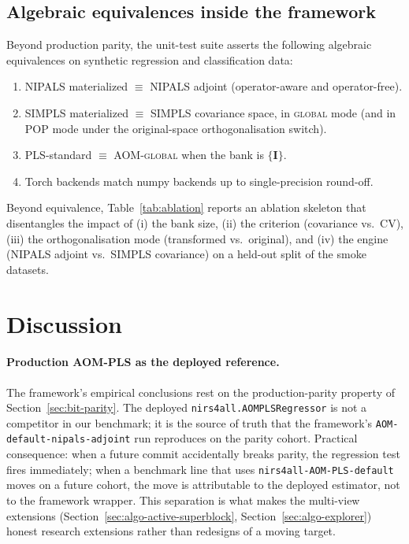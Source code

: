 \documentclass[review,a4paper]{elsarticle}
\newcommand{\identity}{\mathbf{I}}
\newcommand{\AOM}{\textsc{AOM}\xspace}
\newcommand{\POP}{\textsc{POP}\xspace}
\newcommand{\PLS}{\textsc{PLS}\xspace}
\newcommand{\NIPALS}{\textsc{NIPALS}\xspace}
\newcommand{\SIMPLS}{\textsc{SIMPLS}\xspace}
\begin{document}
\subsection{Algebraic equivalences inside the framework}

Beyond production parity, the unit-test suite asserts the following
algebraic equivalences on synthetic regression and classification
data:
\begin{enumerate}[leftmargin=2em]
  \item \NIPALS materialized $\equiv$ \NIPALS adjoint (operator-aware
        and operator-free).
  \item \SIMPLS materialized $\equiv$ \SIMPLS covariance space, in
        \textsc{global} mode (and in \POP mode under the original-space
        orthogonalisation switch).
  \item \PLS-standard $\equiv$ \AOM-\textsc{global} when the bank is
        $\{\identity\}$.
  \item Torch backends match numpy backends up to single-precision
        round-off.
\end{enumerate}
Beyond equivalence, Table~\ref{tab:ablation} reports an ablation skeleton
that disentangles the impact of (i) the bank size,
(ii) the criterion (covariance vs.\ CV), (iii) the orthogonalisation
mode (transformed vs.\ original), and (iv) the engine (\NIPALS adjoint
vs.\ \SIMPLS covariance) on a held-out split of the smoke datasets.

\begin{table}[t]
\centering
\caption{Ablation skeleton. Each cell reports mean RMSEP on the held-out
splits of the smoke regression datasets, together with the median
selected component count.}
\label{tab:ablation}

\end{table}

\section{Discussion}\label{sec:discussion}

\paragraph{Production \AOM-\PLS as the deployed reference.}
The framework's empirical conclusions rest on the production-parity
property of Section~\ref{sec:bit-parity}. The deployed
\verb|nirs4all.AOMPLSRegressor| is not a competitor in our benchmark;
it is the source of truth that the framework's
\texttt{AOM-default-nipals-adjoint} run reproduces on the parity
cohort. Practical consequence:
when a future commit accidentally breaks parity, the regression test
fires immediately; when a benchmark line that uses
\verb|nirs4all-AOM-PLS-default| moves on a future cohort, the move is
attributable to the deployed estimator, not to the framework wrapper.
This separation is what makes the multi-view extensions
(Section~\ref{sec:algo-active-superblock},
Section~\ref{sec:algo-explorer}) honest research extensions rather
than redesigns of a moving target.
\end{document}
